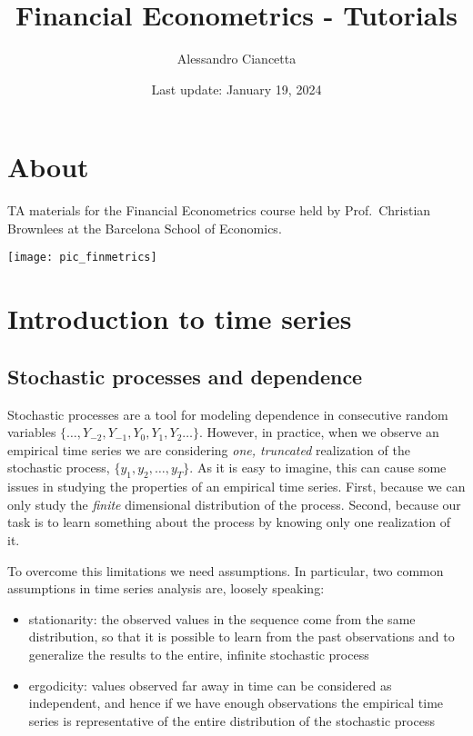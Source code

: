 \documentclass[
]{book}
\title{Financial Econometrics - Tutorials}
\author{Alessandro Ciancetta}
\date{Last update: January 19, 2024}
\begin{document}
\maketitle

{
\setcounter{tocdepth}{1}
\tableofcontents
}
\hypertarget{about}{%
\chapter*{About}\label{about}}

TA materials for the Financial Econometrics course held by Prof.~Christian Brownlees at the Barcelona School of Economics.

\begin{center}\texttt{[image: pic\_finmetrics]} \end{center}

\hypertarget{session01}{%
\chapter{Introduction to time series}\label{session01}}

\hypertarget{stochastic-processes-and-dependence}{%
\section{Stochastic processes and dependence}\label{stochastic-processes-and-dependence}}

Stochastic processes are a tool for modeling dependence in consecutive random variables \(\{\dots, Y_{-2}, Y_{-1}, Y_{0}, Y_{1}, Y_{2} \dots\}\). However, in practice, when we observe an empirical time series we are considering \emph{one, truncated} realization of the stochastic process, \(\{y_1, y_2, \dots, y_T\}\). As it is easy to imagine, this can cause some issues in studying the properties of an empirical time series. First, because we can only study the \emph{finite} dimensional distribution of the process. Second, because our task is to learn something about the process by knowing only one realization of it.

To overcome this limitations we need assumptions. In particular, two common assumptions in time series analysis are, loosely speaking:

\begin{itemize}
\item
  stationarity: the observed values in the sequence come from the same distribution, so that it is possible to learn from the past observations and to generalize the results to the entire, infinite stochastic process
\item
  ergodicity: values observed far away in time can be considered as independent, and hence if we have enough observations the empirical time series is representative of the entire distribution of the stochastic process
\end{itemize}
\end{document}
